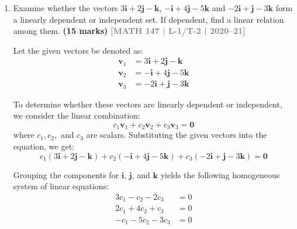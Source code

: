 \documentclass[12pt,a4paper]{article}
\newcommand{\yr}[1]{\hfill\textcolor{gray}{\small\textbf{[#1]}}}
\newcommand{\mk}[1]{\textcolor{orange!70!black}{\small\textbf{(#1 marks)}}}
\begin{document}
\begin{enumerate}
    
    \item Examine whether the vectors $3\mathbf{i}+2\mathbf{j}-\mathbf{k}$, $-\mathbf{i}+4\mathbf{j}-5\mathbf{k}$ and $-2\mathbf{i}+\mathbf{j}-3\mathbf{k}$ form a linearly dependent or independent set. If dependent, find a linear relation among them.
\mk{15} \yr{MATH 147 | L-1/T-2 | 2020--21}

\begin{tcolorbox}[enhanced,breakable,ansbox,colback=cD!4,colframe=cD,boxrule=0.8pt,arc=5pt,title={\textbf{Answer}},fonttitle=\bfseries\color{white},colbacktitle=cD]

Let the given vectors be denoted as:
\begin{align*}
    \mathbf{v}_1 &= 3\mathbf{i} + 2\mathbf{j} - \mathbf{k} \\
    \mathbf{v}_2 &= -\mathbf{i} + 4\mathbf{j} - 5\mathbf{k} \\
    \mathbf{v}_3 &= -2\mathbf{i} + \mathbf{j} - 3\mathbf{k}
\end{align*}

To determine whether these vectors are linearly dependent or independent, we consider the linear combination:
\[ c_1\mathbf{v}_1 + c_2\mathbf{v}_2 + c_3\mathbf{v}_3 = \mathbf{0} \]
where $c_1, c_2,$ and $c_3$ are scalars. Substituting the given vectors into the equation, we get:
\[ c_1(3\mathbf{i} + 2\mathbf{j} - \mathbf{k}) + c_2(-\mathbf{i} + 4\mathbf{j} - 5\mathbf{k}) + c_3(-2\mathbf{i} + \mathbf{j} - 3\mathbf{k}) = \mathbf{0} \]

Grouping the components for $\mathbf{i}$, $\mathbf{j}$, and $\mathbf{k}$ yields the following homogeneous system of linear equations:
\begin{align*}
    3c_1 - c_2 - 2c_3 &= 0 \\
    2c_1 + 4c_2 + c_3 &= 0 \\
    -c_1 - 5c_2 - 3c_3 &= 0
\end{align*}


\end{tcolorbox}
\end{enumerate}
\end{document}
